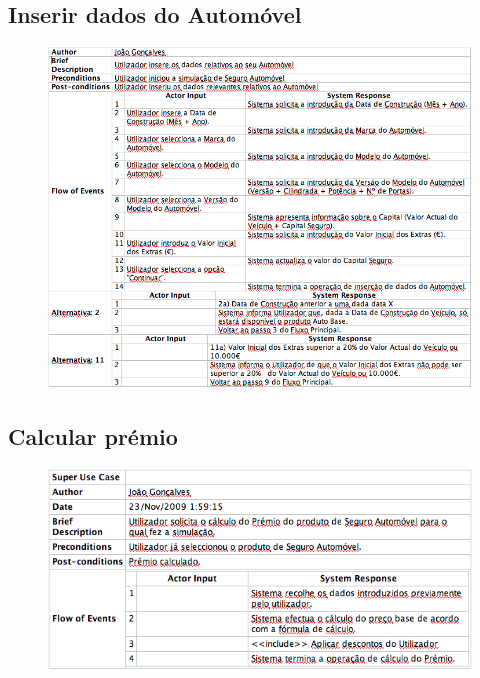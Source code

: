\subsection{Inserir dados do Automóvel}
\begin{figure}[!htb]
	\centering
	\includegraphics[scale=0.6]{images/Prints/RealizacaoSeguroAutomovel/InserirDadosAutomovel.png}
\end{figure}

\pagebreak

\subsection{Calcular prémio}
\begin{figure}[!htb]
	\centering
	\includegraphics[scale=0.6]{images/Prints/RealizacaoSeguroAutomovel/CalcularPremio.png}
\end{figure}

